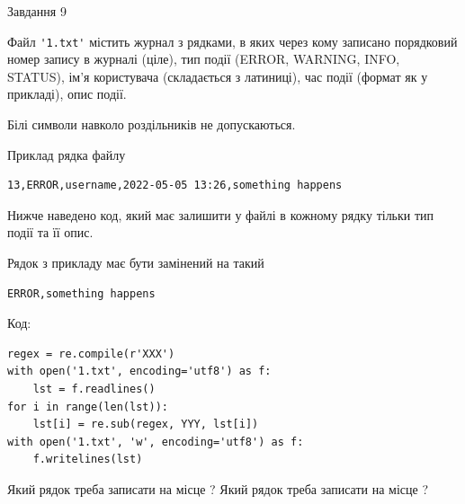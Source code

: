 \documentclass[12pt, ukrainian]{article}
\def\code#1{\Verb!#1!}
\begin{document}
{\begin{minipage}[t]{8.0cm}
\end{minipage}

               
{\begin{center}Завдання {9}\end{center}}
\vspace{-4mm}
Файл \code{'1.txt'} містить журнал з рядками, в яких через кому записано поряд\-ко\-вий номер запису в журналі (ціле), тип події (ERROR, WARNING, INFO, STATUS), ім'я користувача (складається з латиниці), час події (фор\-мат як у прикладі), опис події.

Білі символи навколо роздільників не допускаються.

Приклад рядка файлу



\begin{verbatim}
13,ERROR,username,2022-05-05 13:26,something happens
\end{verbatim}


Нижче наведено код, який має залишити у файлі в кожному рядку тільки тип події та її опис.

Рядок з прикладу має бути замінений на такий



\begin{verbatim}
ERROR,something happens
\end{verbatim}




Код:



\begin{verbatim}
regex = re.compile(r'XXX')
with open('1.txt', encoding='utf8') as f:
    lst = f.readlines()
for i in range(len(lst)):
    lst[i] = re.sub(regex, YYY, lst[i])
with open('1.txt', 'w', encoding='utf8') as f:
    f.writelines(lst)
\end{verbatim}







Який рядок треба записати на місце  ?
Який рядок треба записати на місце  ?\par

}
\newpage
\end{document}
